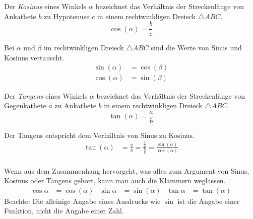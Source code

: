\begin{defi}[Kosinus]
 Der \emph{Kosinus} eines Winkels \(\alpha\) bezeichnet das Verhältnis der Streckenlänge von Ankathete \(b\) zu Hypotenuse \(c\) in einem rechtwinkligen Dreieck \(\triangle ABC\).
 \begin{equation*}
  \cos (\alpha ) = \frac{b}{c}
 \end{equation*}

\end{defi}

\begin{folg}
 Bei \(\alpha\) und \(\beta\) im rechtwinkligen Dreieck \(\triangle ABC\) sind die Werte von Sinus und Kosinus vertauscht.
 \begin{align*}
  \sin ( \alpha ) &= \cos(\beta)\\
  \cos (\alpha) &= \sin (\beta)
 \end{align*}

\end{folg}


\begin{defi}[Tangens]
 Der \emph{Tangens} eines Winkels \(\alpha\) bezeichnet das Verhältnis der Streckenlänge von Gegenkathete \(a\) zu Ankathete \(b\) in einem rechtwinkligen Dreieck \(\triangle ABC\).
 \begin{equation*}
  \tan (\alpha ) = \frac{a}{b}
 \end{equation*}
\end{defi}

\begin{folg}
 Der Tangens entspricht dem Verhältnis von Sinus zu Kosinus.
 \begin{align*}
  \tan (\alpha ) &= \frac{a}{b} = \frac{\frac{a}{c}}{\frac{b}{c}} = \frac{\sin(\alpha)}{\cos(\alpha)}\\
 \end{align*}

\end{folg}

\begin{beme}[Notation]
 Wenn aus dem Zusammenhang hervorgeht, was alles zum Argument von Sinus, Kosinus oder Tangens gehört, kann man auch die Klammern weglassen.
 \begin{align*}
  \cos \alpha &= \cos (\alpha) & \sin \alpha &= \sin (\alpha) & \tan \alpha &= \tan (\alpha)
 \end{align*}
Beachte: Die alleinige Angabe eines Ausdrucks wie \(\sin\) ist die Angabe einer Funktion, nicht die Angabe einer Zahl.
\end{beme}

